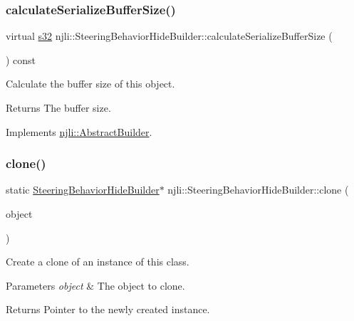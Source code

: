 \subsubsection{\texorpdfstring{calculate\+Serialize\+Buffer\+Size()}{calculateSerializeBufferSize()}}
{\footnotesize\ttfamily virtual \mbox{\hyperlink{_util_8h_aa62c75d314a0d1f37f79c4b73b2292e2}{s32}} njli\+::\+Steering\+Behavior\+Hide\+Builder\+::calculate\+Serialize\+Buffer\+Size (\begin{DoxyParamCaption}{ }\end{DoxyParamCaption}) const\hspace{0.3cm}{\ttfamily [virtual]}}

Calculate the buffer size of this object.

\begin{DoxyReturn}{Returns}
The buffer size. 
\end{DoxyReturn}


Implements \mbox{\hyperlink{classnjli_1_1_abstract_builder_aa1d220053e182c37b31b427499c6eacf}{njli\+::\+Abstract\+Builder}}.

\mbox{\label{classnjli_1_1_steering_behavior_hide_builder_ac579b37c08f1ca2cbac9f4f7215b05aa}} 
\subsubsection{\texorpdfstring{clone()}{clone()}}
{\footnotesize\ttfamily static \mbox{\hyperlink{classnjli_1_1_steering_behavior_hide_builder}{Steering\+Behavior\+Hide\+Builder}}$\ast$ njli\+::\+Steering\+Behavior\+Hide\+Builder\+::clone (\begin{DoxyParamCaption}\item[{const \mbox{\hyperlink{classnjli_1_1_steering_behavior_hide_builder}{Steering\+Behavior\+Hide\+Builder}} \&}]{object }\end{DoxyParamCaption})\hspace{0.3cm}{\ttfamily [static]}}

Create a clone of an instance of this class.


\begin{DoxyParams}{Parameters}
{\em object} & The object to clone.\\
\hline
\end{DoxyParams}
\begin{DoxyReturn}{Returns}
Pointer to the newly created instance. 
\end{DoxyReturn}
\mbox{\label{classnjli_1_1_steering_behavior_hide_builder_a33a4c0e42677f40bc2bc670f73991f46}} 
